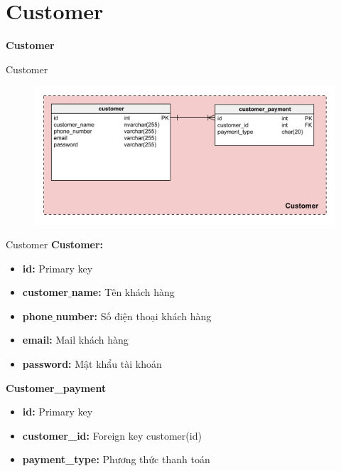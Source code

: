 \documentclass[aspectratio=43,xcolor=dvipsnames]{beamer}
\begin{document}
	\section{Customer}
	\begin{frame}
		\textcolor{structure}{\Huge{\textbf{Customer}}}
	\end{frame}
	\begin{frame}{Customer}
		\begin{figure}[ht!]
			\centerline{\includegraphics[width=1\textwidth]{customer.png}}
			\label{fig:ass1}
		\end{figure}
	\end{frame}
	\begin{frame}{Customer}
		\textcolor{structure}{\large{\textbf{Customer:}}}
		\begin{itemize}
			\item \textbf{id:} Primary key
			\item \textbf{customer$\_$name:} Tên khách hàng
			\item \textbf{phone$\_$number:} Số điện thoại khách hàng
			\item \textbf{email:} Mail khách hàng
			\item \textbf{password:} Mật khẩu tài khoản
		\end{itemize}
		\textcolor{structure}{\large{\textbf{Customer\_payment}}}
		\begin{itemize}
			\item \textbf{id:} Primary key
			\item \textbf{customer\_id:} Foreign key customer(id)
			\item \textbf{payment\_type:} Phương thức thanh toán
		\end{itemize}
	\end{frame}
\end{document}

